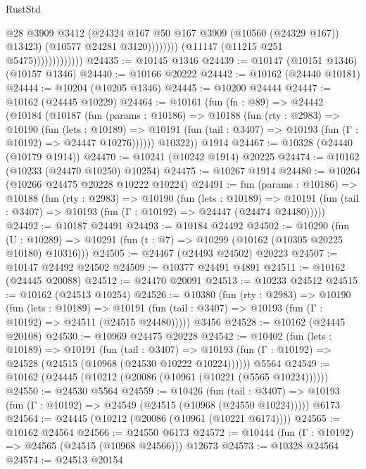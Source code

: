 \begin{lexlean}{RustStd}
\begin{coremodule}
                                        @28
                                        @3909
                                        @3412
                                        (@24324 @167 @50 @167 @3909 (@10560 (@24329 @167)) @13423)
                                        (@10577 @24281 @3120))))))))
                          (@11147 (@11215 @251 @5475)))))))))))))
@24435 := @10145 @1346
@24439 := @10147 (@10151 @1346) (@10157 @1346)
@24440 := @10166 @20222
@24442 := @10162 (@24440 @10181)
@24444 := @10204 (@10205 @1346)
@24445 := @10200 @24444
@24447 := @10162 (@24445 @10229)
@24464 := @10161
    (fun (fn : @89) =>
    @24442
      (@10184
        (@10187
          (fun (params : @10186) =>
          @10188
            (fun (rty : @2983) =>
            @10190
              (fun (lets : @10189) =>
              @10191 (fun (tail : @3407) => @10193 (fun (Γ : @10192) => @24447 @10276))))))
        @10322))
    @1914
@24467 := @10328 (@24440 (@10179 @1914))
@24470 := @10241 (@10242 @1914) @20225
@24474 := @10162 (@10233 (@24470 @10250) @10254)
@24475 := @10267 @1914
@24480 := @10264 (@10266 @24475 @20228 @10222 @10224)
@24491 := fun (params : @10186) =>
  @10188
    (fun (rty : @2983) =>
    @10190
      (fun (lets : @10189) =>
      @10191 (fun (tail : @3407) => @10193 (fun (Γ : @10192) => @24447 (@24474 @24480)))))
@24492 := @10187 @24491
@24493 := @10184 @24492
@24502 := @10290
    (fun (U : @10289) => @10291 (fun (t : @7) => @10299 (@10162 (@10305 @20225 @10180) @10316)))
@24505 := @24467 (@24493 @24502) @20223
@24507 := @10147 @24492 @24502
@24509 := @10377 @24491 @4891
@24511 := @10162 (@24445 @20088)
@24512 := @24470 @20091
@24513 := @10233 @24512
@24515 := @10162 (@24513 @10254)
@24526 := @10380
    (fun (rty : @2983) =>
    @10190
      (fun (lets : @10189) =>
      @10191 (fun (tail : @3407) => @10193 (fun (Γ : @10192) => @24511 (@24515 @24480)))))
    @3456
@24528 := @10162 (@24445 @20108)
@24530 := @10969 @24475 @20228
@24542 := @10402
    (fun (lets : @10189) =>
    @10191
      (fun (tail : @3407) =>
      @10193 (fun (Γ : @10192) => @24528 (@24515 (@10968 (@24530 @10222 @10224))))))
    @5564
@24549 := @10162 (@24445 (@10212 (@20086 (@10961 (@10221 (@5565 @10224))))))
@24550 := @24530 @5564
@24559 := @10426
    (fun (tail : @3407) => @10193 (fun (Γ : @10192) => @24549 (@24515 (@10968 (@24550 @10224)))))
    @6173
@24564 := @24445 (@10212 (@20086 (@10961 (@10221 @6174))))
@24565 := @10162 @24564
@24566 := @24550 @6173
@24572 := @10444 (fun (Γ : @10192) => @24565 (@24515 (@10968 @24566))) @12673
@24573 := @10328 @24564
@24574 := @24513 @20154

\end{coremodule}
\end{lexlean}
